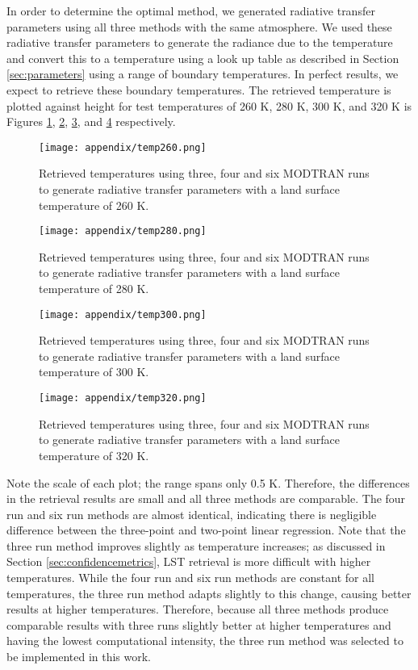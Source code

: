 \documentclass{book}
\begin{document}
In order to determine the optimal method, we generated radiative transfer parameters using all three methods with the same atmosphere.  We used these radiative transfer parameters to generate the radiance due to the temperature and convert this to a temperature using a look up table as described in Section \ref{sec:parameters} using a range of boundary temperatures.  In perfect results, we expect to retrieve these boundary temperatures.  The retrieved temperature is plotted against height for test temperatures of 260 K, 280 K, 300 K, and 320 K is Figures \ref{fig:temp260}, \ref{fig:temp280}, \ref{fig:temp300}, and \ref{fig:temp320} respectively.

\begin{figure}[H]
\centering
\texttt{[image: appendix/temp260.png]}
\caption{Retrieved temperatures using three, four and six MODTRAN runs to generate radiative transfer parameters with a land surface temperature of 260 K.}
\label{fig:temp260}
\end{figure}

\begin{figure}[H]
\centering
\texttt{[image: appendix/temp280.png]}
\caption{Retrieved temperatures using three, four and six MODTRAN runs to generate radiative transfer parameters with a land surface temperature of 280 K.}
\label{fig:temp280}
\end{figure}

\begin{figure}[H]
\centering
\texttt{[image: appendix/temp300.png]}
\caption{Retrieved temperatures using three, four and six MODTRAN runs to generate radiative transfer parameters with a land surface temperature of 300 K.}
\label{fig:temp300}
\end{figure}

\begin{figure}[H]
\centering
\texttt{[image: appendix/temp320.png]}
\caption{Retrieved temperatures using three, four and six MODTRAN runs to generate radiative transfer parameters with a land surface temperature of 320 K.}
\label{fig:temp320}
\end{figure}

Note the scale of each plot; the range spans only 0.5 K.  Therefore, the differences in the retrieval results are small and all three methods are comparable.  The four run and six run methods are almost identical, indicating there is negligible difference between the three-point and two-point linear regression.  Note that the three run method improves slightly as temperature increases;  as discussed in Section \ref{sec:confidencemetrics}, LST retrieval is more difficult with higher temperatures.  While the four run and six run methods are constant for all temperatures, the three run method adapts slightly to this change, causing better results at higher temperatures.  Therefore, because all three methods produce comparable results with three runs slightly better at higher temperatures and having the lowest computational intensity, the three run method was selected to be implemented in this work.



\end{document}
